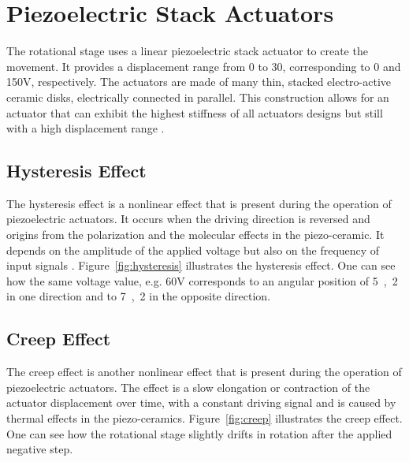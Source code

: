 \section{Piezoelectric Stack Actuators}
The rotational stage uses a linear piezoelectric stack actuator to create the movement. It provides a displacement range from 0 to \unit{30}{\micro\meter}, corresponding to 0 and 150V, respectively. The actuators are made of many thin, stacked electro-active ceramic disks, electrically connected in parallel. This construction allows for an actuator that can exhibit the highest stiffness of all actuators designs but still with a high displacement range \cite{Piezo:2008}.

\subsection{Hysteresis Effect}
The hysteresis effect is a nonlinear effect that is present during the operation of piezoelectric actuators. It occurs when the driving direction is reversed and origins from the polarization and the molecular effects in the piezo-ceramic. It depends on the amplitude of the applied voltage but also on the frequency of input signals \cite{Qingson:2016}. Figure~\ref{fig:hysteresis} illustrates the hysteresis effect. One can see how the same voltage value, e.g. 60V corresponds to an angular position of \unit{5,2}{\micro\rad} in one direction and to \unit{7,2}{\micro\rad} in the opposite direction.

\subsection{Creep Effect}
The creep effect is another nonlinear effect that is present during the operation of piezoelectric actuators. The effect is a slow elongation or contraction of the actuator displacement over time, with a constant driving signal and is caused by thermal effects in the piezo-ceramics. Figure~\ref{fig:creep} illustrates the creep effect. One can see how the rotational stage slightly drifts in rotation after the applied negative step.

